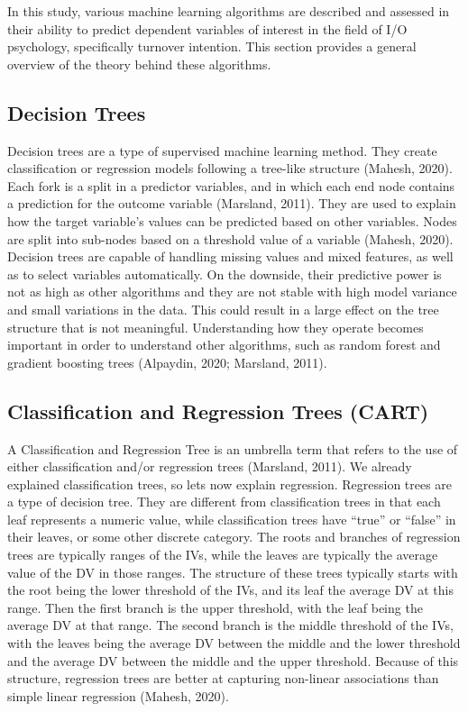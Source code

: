 \documentclass[
  man]{apa7}
\begin{document}
In this study, various machine learning algorithms are described and assessed in their ability to predict dependent variables of interest in the field of I/O psychology, specifically turnover intention.
This section provides a general overview of the theory behind these algorithms.

\hypertarget{decision-trees}{%
\subsection{Decision Trees}\label{decision-trees}}

Decision trees are a type of supervised machine learning method.
They create classification or regression models following a tree-like structure (Mahesh, 2020).
Each fork is a split in a predictor variables, and in which each end node contains a prediction for the outcome variable (Marsland, 2011).
They are used to explain how the target variable's values can be predicted based on other variables.
Nodes are split into sub-nodes based on a threshold value of a variable (Mahesh, 2020).
Decision trees are capable of handling missing values and mixed features, as well as to select variables automatically.
On the downside, their predictive power is not as high as other algorithms and they are not stable with high model variance and small variations in the data.
This could result in a large effect on the tree structure that is not meaningful.
Understanding how they operate becomes important in order to understand other algorithms, such as random forest and gradient boosting trees (Alpaydin, 2020; Marsland, 2011).

\hypertarget{classification-and-regression-trees-cart}{%
\subsection{Classification and Regression Trees (CART)}\label{classification-and-regression-trees-cart}}

A Classification and Regression Tree is an umbrella term that refers to the use of either classification and/or regression trees (Marsland, 2011).
We already explained classification trees, so lets now explain regression.
Regression trees are a type of decision tree.
They are different from classification trees in that each leaf represents a numeric value, while classification trees have ``true'' or ``false'' in their leaves, or some other discrete category.
The roots and branches of regression trees are typically ranges of the IVs, while the leaves are typically the average value of the DV in those ranges.
The structure of these trees typically starts with the root being the lower threshold of the IVs, and its leaf the average DV at this range.
Then the first branch is the upper threshold, with the leaf being the average DV at that range.
The second branch is the middle threshold of the IVs, with the leaves being the average DV between the middle and the lower threshold and the average DV between the middle and the upper threshold.
Because of this structure, regression trees are better at capturing non-linear associations than simple linear regression (Mahesh, 2020).
\end{document}

